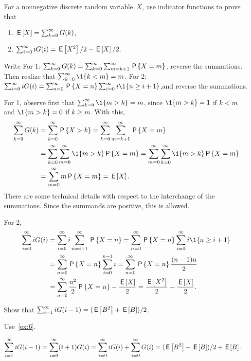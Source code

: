 \documentclass[queueing-book.tex]{subfiles}
\begin{document}
\begin{exercise}\label{ex:6}
 For a nonnegative discrete random variable~$X$, use indicator functions to prove that
 \begin{enumerate}
 \item  $\E X = \sum_{k=0}^\infty G(k)$,
 \item $\sum_{i=0}^\infty i G(i) = \E{X^2}/2 - \E{X}/2$.
 \end{enumerate}
\begin{hint}
Write
For 1: $\sum_{k=0}^\infty G(k) = \sum_{k=0}^\infty \sum_{m=k+1}^\infty \P{X=m}$, reverse the summations. Then realize that $\sum_{k=0}^\infty \1{k<m} = m$. For 2:
$\sum_{i=0}^\infty i G(i) = \sum_{n=0}^\infty \P{X=n} \sum_{i=0}^\infty i \1{n\geq i+1}$,and reverse the summations.
\end{hint}
\begin{solution}
For 1, observe first that $\sum_{k=0}^\infty \1{m>k} = m$, since $\1{m>k}=1$ if $k<m$ and $\1{m>k} = 0$ if $k\geq m$. With this,
\begin{align*}
\sum_{k=0}^\infty G(k)
&= \sum_{k=0}^\infty \P{X>k}
= \sum_{k=0}^\infty \sum_{m=k+1}^\infty \P{X=m} \\
& = \sum_{k=0}^\infty \sum_{m=0}^\infty \1{m>k} \P{X=m}
= \sum_{m=0}^\infty \sum_{k=0}^\infty \1{m>k} \P{X=m} \\
&= \sum_{m=0}^\infty m\P{X=m} = \E X.
\end{align*}
There are some technical details with respect to the interchange of the summations.
Since the summands are positive, this is allowed.

For 2,
\begin{align*}
\sum_{i=0}^\infty i G(i)
&= \sum_{i=0}^\infty i \sum_{n=i+1}^\infty \P{X=n} = \sum_{n=0}^\infty \P{X=n} \sum_{i=0}^\infty i \1{n\geq i+1} \\
&= \sum_{n=0}^\infty \P{X=n} \sum_{i=0}^{n-1}i = \sum_{n=0}^\infty \P{X=n} \frac{(n-1)n}{2} \\
&= \sum_{n=0}^\infty \frac{n^2}{2} \P{X=n} - \frac{\E X}{2}
= \frac{\E{X^2}}{2} - \frac{\E X}{2}.
\end{align*}
\end{solution}
\end{exercise}



\begin{exercise}\label{ex:ER}
 Show that $\sum_{i=1}^\infty i G(i-1)= ({\E{B^2} + \E B})/{2}$.
\begin{hint}
 Use~\cref{ex:6}.
\end{hint}
\begin{solution}
\begin{equation*}
 \begin{split}
 \sum_{i=1}^\infty i G(i-1)
&=\sum_{i=0}^\infty (i+1) G(i)
=\sum_{i=0}^\infty i G(i) +
\sum_{i=0}^\infty G(i)= (\E{B^2} - \E B)/2 + \E B.
 \end{split}
\end{equation*}
\end{solution}
\end{exercise}
\end{document}
